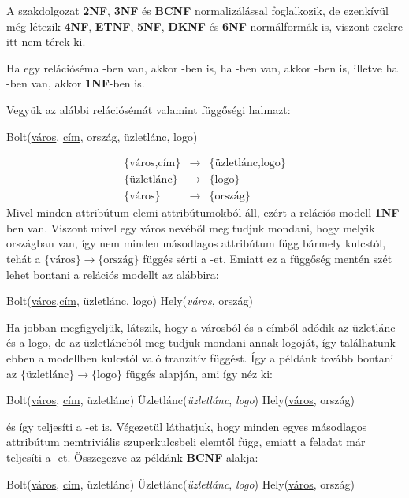 \begin{megj}
A szakdolgozat \textbf{2NF}, \textbf{3NF} és \textbf{BCNF} normalizálással foglalkozik, de ezenkívül még létezik \textbf{4NF}, \textbf{ETNF}, \textbf{5NF}, \textbf{DKNF} és \textbf{6NF} normálformák is, viszont ezekre itt nem térek ki.
\end{megj}

\begin{tet}
Ha egy relációséma \BCNF-ben van, akkor \nfh-ben is, ha \nfh-ben van, akkor \nfk -ben is, illetve ha \nfk-ben van, akkor \textbf{1NF}-ben is. 
\end{tet}

\begin{pld}
Vegyük az alábbi relációsémát valamint függőségi halmazt:
\begin{center}
    Bolt(\underline{város}, \underline{cím}, ország, üzletlánc, logo)
\end{center}
$$
    \begin{matrix}
    \{\text{város,cím}\} & \longrightarrow & \{\text{üzletlánc,logo}\} \\
    \{\text{üzletlánc}\} & \longrightarrow & \{\text{logo}\} \\
    \{\text{város}\}  & \longrightarrow & \{\text{ország}\}
    \end{matrix}
$$
Mivel minden attribútum elemi attribútumokból áll, ezért a relációs modell \textbf{1NF}-ben van. Viszont mivel egy város nevéből meg tudjuk mondani, hogy melyik országban van, így nem minden másodlagos attribútum függ bármely kulcstól, tehát a $\{\text{város}\} \rightarrow \{\text{ország}\}$ függés sérti a \nfk-et. Emiatt ez a függőség mentén szét lehet bontani a relációs modellt az alábbira:
\begin{center}
    Bolt(\underline{város},\underline{cím}, üzletlánc, logo) \break
    Hely(\textit{város}, ország)
\end{center}
Ha jobban megfigyeljük, látszik, hogy a városból és a címből adódik az üzletlánc és a logo, de az üzletláncból meg tudjuk mondani annak logoját, így találhatunk ebben a modellben kulcstól való tranzitív függést. Így a példánk tovább bontani az $\{\text{üzletlánc}\} \rightarrow \{\text{logo}\}$ függés alapján, ami így néz ki:
\begin{center}
    Bolt(\underline{város}, \underline{cím}, üzletlánc) \break
    Üzletlánc(\textit{üzletlánc}, \textit{logo})\break
    Hely(\underline{város}, ország)
\end{center}
és így teljesíti a \nfh-et is. Végezetül láthatjuk, hogy minden egyes másodlagos attribútum nemtriviális szuperkulcsbeli elemtől függ, emiatt a feladat már teljesíti a \BCNF-et.\hfill \break
Összegezve az példánk \textbf{BCNF} alakja:
\begin{center}
    Bolt(\underline{város}, \underline{cím}, üzletlánc) \break
    Üzletlánc(\textit{üzletlánc}, \textit{logo})\break
    Hely(\underline{város}, ország)
\end{center}
\end{pld}
